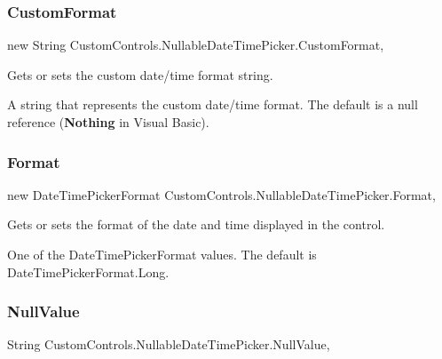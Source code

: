 \subsubsection{\texorpdfstring{Custom\+Format}{CustomFormat}}
{\footnotesize\ttfamily new String Custom\+Controls.\+Nullable\+Date\+Time\+Picker.\+Custom\+Format\hspace{0.3cm}{\ttfamily [get]}, {\ttfamily [set]}}



Gets or sets the custom date/time format string. 

A string that represents the custom date/time format. The default is a null reference ({\bfseries Nothing} in Visual Basic).

\mbox{\label{class_custom_controls_1_1_nullable_date_time_picker_a7e3ba070bcfbb12d9b954679652e9093}} 
\subsubsection{\texorpdfstring{Format}{Format}}
{\footnotesize\ttfamily new Date\+Time\+Picker\+Format Custom\+Controls.\+Nullable\+Date\+Time\+Picker.\+Format\hspace{0.3cm}{\ttfamily [get]}, {\ttfamily [set]}}



Gets or sets the format of the date and time displayed in the control. 

One of the Date\+Time\+Picker\+Format values. The default is Date\+Time\+Picker\+Format.\+Long.\mbox{\label{class_custom_controls_1_1_nullable_date_time_picker_a9efcb8f7340f813306a8e2ca388e156e}} 
\subsubsection{\texorpdfstring{Null\+Value}{NullValue}}
{\footnotesize\ttfamily String Custom\+Controls.\+Nullable\+Date\+Time\+Picker.\+Null\+Value\hspace{0.3cm}{\ttfamily [get]}, {\ttfamily [set]}}



